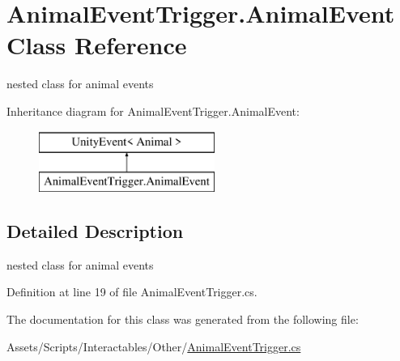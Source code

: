 \hypertarget{class_animal_event_trigger_1_1_animal_event}{}\section{Animal\+Event\+Trigger.\+Animal\+Event Class Reference}
\label{class_animal_event_trigger_1_1_animal_event}


nested class for animal events  


Inheritance diagram for Animal\+Event\+Trigger.\+Animal\+Event\+:\begin{figure}[H]
\begin{center}
\leavevmode
\includegraphics[height=2.000000cm]{class_animal_event_trigger_1_1_animal_event}
\end{center}
\end{figure}


\subsection{Detailed Description}
nested class for animal events 



Definition at line 19 of file Animal\+Event\+Trigger.\+cs.



The documentation for this class was generated from the following file\+:\begin{DoxyCompactItemize}
\item 
Assets/\+Scripts/\+Interactables/\+Other/\mbox{\hyperlink{_animal_event_trigger_8cs}{Animal\+Event\+Trigger.\+cs}}\end{DoxyCompactItemize}

